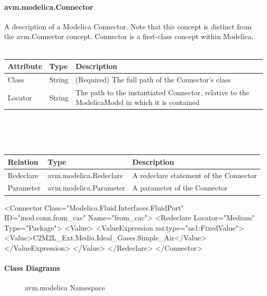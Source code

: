 \paragraph{avm.modelica.Connector}
A description of a Modelica Connector. Note that this concept is distinct from the avm.Connector concept. Connector is a first-class concept within Modelica.
\\ \\
\begin{tabular}{ l l p{9cm} }
\textbf{Attribute} & \textbf{Type} & \textbf{Description} \\ \hline
Class & String & (Required) The full path of the Connector's class \\ \hline
Locator & String & The path to the instantiated Connector, relative to the ModelicaModel in which it is contained \\ \hline
\end{tabular}
\\ \\ \\
\begin{tabular}{ l l p{9cm} }
\textbf{Relation} & \textbf{Type} & \textbf{Description} \\ \hline
Redeclare & avm.modelica.Redeclare & A redeclare statement of the Connector \\ \hline
Parameter & avm.modelica.Parameter & A parameter of the Connector \\ \hline
\end{tabular}

\begin{MyVerbatim}
    <Connector 
      Class="Modelica.Fluid.Interfaces.FluidPort" 
      ID="mod.conn.from_cac" 
      Name="from_cac">
      <Redeclare Locator="Medium" Type="Package">
        <Value>
          <ValueExpression xsi:type="ns1:FixedValue">
            <Value>C2M2L_Ext.Media.Ideal_Gases.Simple_Air</Value>
          </ValueExpression>
        </Value>
      </Redeclare>
    </Connector>
\end{MyVerbatim}

\paragraph{Class Diagrams}
\begin{figure}[h!]
\caption{avm.modelica Namespace}
\end{figure}

